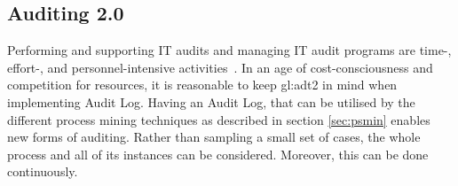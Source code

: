 








\subsection{Auditing 2.0}

Performing and supporting IT audits and managing IT audit programs are time-, effort-, and personnel-intensive activities~\citep{GANTZ20141-T}. In an age of cost-consciousness and competition for resources, it is reasonable to keep \gls{gl:adt2} in mind when implementing Audit Log. Having an Audit Log, that can be utilised by the different process mining techniques as described in section \ref{sec:psmin} enables new forms of auditing. Rather than sampling a small set of cases, the whole process and all of its instances can be considered. Moreover, this can be done continuously.

